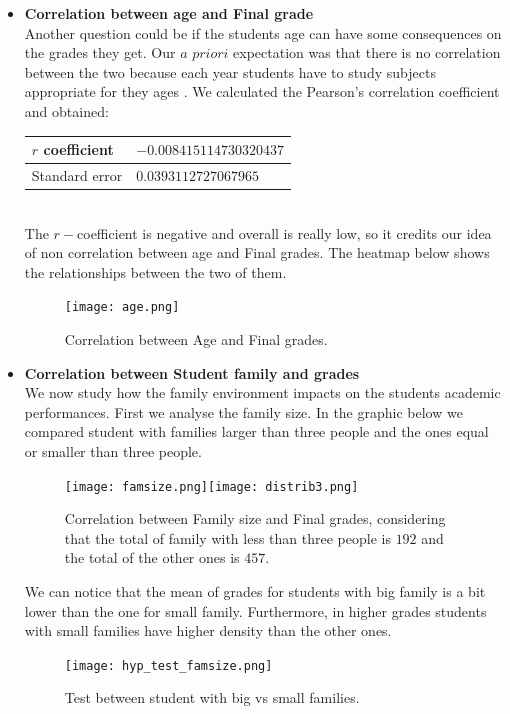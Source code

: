 \documentclass[a4paper, 11pt]{report}
\theoremstyle{definition}
\numberwithin{equation}{section}		%
\numberwithin{table}{section}				%
\begin{document}
\begin{itemize}
\item \textbf{Correlation between age and Final grade}
\\Another question could be if the students age can have some consequences on the grades they get. Our $a$ $priori$ expectation was that there is no correlation between the two because each year students have to study subjects appropriate for they ages . We calculated the Pearson's correlation coefficient and obtained:
\begin{center}
\begin{tabular}{|p{3cm}|p{4cm}|}
$r$ coefficient & $-0.008415114730320437$ \\
\hline
Standard error & $0.0393112727067965$ \\
\hline
\end{tabular}
\end{center}
\\The $r-$coefficient is negative and overall is really low, so it credits our idea of non correlation between age and Final grades. The heatmap below shows the relationships between the two of them.

\medskip
\medskip
\begin{figure}[h]\centering
\texttt{[image: age.png]}
\caption{Correlation between Age and Final grades.}
\end{figure}


\item \textbf{Correlation between Student family and grades}
\\We now study how the family environment impacts on the students academic performances. First we analyse the family size. In the graphic below we compared student with families larger than three people and the ones equal or smaller than three people.

\begin{figure}[h]\centering
\texttt{[image: famsize.png]}\quad\texttt{[image: distrib3.png]}
\caption{Correlation between Family size and Final grades, considering that the total of family with less than three people is $192$ and the total of the other ones is $457$.}
\end{figure}
We can notice that the mean of grades for students with big family is a bit lower than the one for small family. Furthermore, in higher grades students with small families have higher density than the other ones.

\begin{figure}[h]\centering
\texttt{[image: hyp\_test\_famsize.png]}
\caption{Test between student with big vs  small families.}
\end{figure}


\end{itemize}
\end{document}
